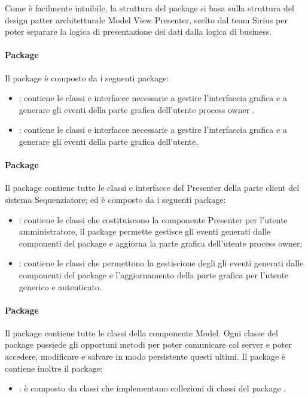 Come è facilmente intuibile, la struttura del package \client{} si basa sulla struttura del design patter
architetturale Model View Presenter, scelto dal team Sirius per poter separare la logica di presentazione dei dati dalla logica di business.\\

\paragraph{Package \view{}}
Il package \view{} è composto da i seguenti package:
\begin{itemize}
	\item \viewAdmin{}: contiene le classi e interfacce necessarie a gestire 
l’interfaccia grafica e a generare gli eventi della parte grafica dell'utente process owner .
	\item \viewUser{}: contiene le classi e interfacce necessarie a gestire l’interfaccia
grafica e a generare gli eventi della parte grafica dell’utente.
\end{itemize}
\paragraph{Package \logic{}}
Il package \logic{} contiene tutte le classi e interfacce del Presenter della 
parte client del sistema Sequenziatore; ed è composto da i seguenti package:
\begin{itemize}
	\item \logicAdmin{}: contiene le classi che costituiscono la componente Presenter
per l’utente amministratore, il package \logicAdmin{} permette gestisce gli eventi generati dalle componenti del package \viewAdmin{} e 
aggiorna la parte grafica dell'utente process owner;
	\item \logicUser{}: contiene le classi che permettono la gestiscione degli gli eventi generati dalle componenti del package
\viewUser{} e l'aggiornamento della parte grafica per l'utente generico e autenticato.
\end{itemize}
\paragraph{Package \model{}}
Il package \model{} contiene tutte le classi della componente Model. Ogni classe del package \model{} possiede gli opportuni metodi per poter
comunicare col server e poter accedere, modificare e salvare in modo persistente questi ultimi.
Il package è contiene inoltre il package:
\begin{itemize}
	\item \collection{}: è composto da classi che implementano collezioni di classi del package \model{}.
\end{itemize} 
